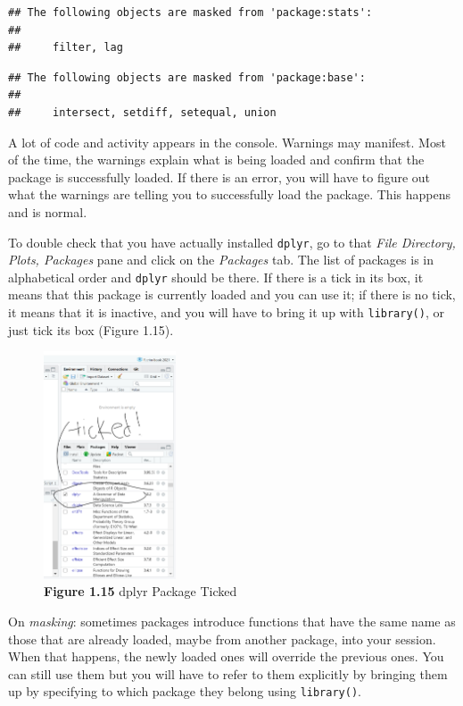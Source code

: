 \documentclass[
]{book}
\begin{document}
\begin{verbatim}
## The following objects are masked from 'package:stats':
## 
##     filter, lag
\end{verbatim}

\begin{verbatim}
## The following objects are masked from 'package:base':
## 
##     intersect, setdiff, setequal, union
\end{verbatim}

A lot of code and activity appears in the console. Warnings may manifest. Most of the time, the warnings explain what is being loaded and confirm that the package is successfully loaded. If there is an error, you will have to figure out what the warnings are telling you to successfully load the package. This happens and is normal.

To double check that you have actually installed \texttt{dplyr}, go to that \emph{File Directory, Plots, Packages} pane and click on the \emph{Packages} tab. The list of packages is in alphabetical order and \texttt{dplyr} should be there. If there is a tick in its box, it means that this package is currently loaded and you can use it; if there is no tick, it means that it is inactive, and you will have to bring it up with \texttt{library()}, or just tick its box (Figure 1.15).

\begin{figure}
\centering
\includegraphics[width=0.35\textwidth,height=\textheight]{Images/dplyr.png}
\caption{\textbf{Figure 1.15} dplyr Package Ticked}
\end{figure}

On \emph{masking}: sometimes packages introduce functions that have the same name as those that are already loaded, maybe from another package, into your session. When that happens, the newly loaded ones will override the previous ones. You can still use them but you will have to refer to them explicitly by bringing them up by specifying to which package they belong using \texttt{library()}.
\end{document}

